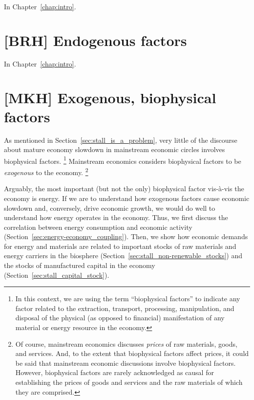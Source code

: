 In Chapter~\ref{chap:intro}.


\section{[BRH] Endogenous factors}
\label{sec:endogenous_factors}

In Chapter~\ref{chap:intro}.


\section{[MKH] Exogenous, biophysical factors}
\label{sec:exogenous_factors}

As mentioned in Section~\ref{sec:stall_is_a_problem}, 
very little of the discourse 
about mature economy slowdown 
in mainstream economic circles
involves biophysical factors.%
	\footnote{
	In this context, we are using the term ``biophysical factors''
	to indicate any factor related to 
	the extraction, transport, processing, manipulation, and disposal 
	of the physical (as opposed to financial) manifestation 
	of any material or energy resource in the economy.
	}
Mainstream economics considers biophysical factors
to be \emph{exogenous} to the economy.%
	\footnote{
	Of course, mainstream economics discusses \emph{prices}
	of raw materials, goods, and services. 
	And, to the extent that biophysical factors affect prices,
	it could be said that mainstream economic discussions involve
	biophysical factors.
	However, biophysical factors are rarely acknowledged as causal 
	for establishing the prices of goods and services and the raw materials 
	of which they are comprised.
	}

Arguably, the most important (but not the only) biophysical factor 
vis-\`{a}-vis the economy is energy.
If we are to understand how exogenous factors cause economic slowdown
and, conversely, drive economic growth,
we would do well to understand how energy operates in the economy.
Thus, we first discuss the correlation 
between energy consumption and economic activity 
(Section~\ref{sec:energy-economy_coupling}).
Then, we show how economic demands for energy and materials
are related to important stocks 
of raw materials and energy carriers in the biosphere 
(Section~\ref{sec:stall_non-renewable_stocks})
and the stocks of manufactured capital in the economy
(Section~\ref{sec:stall_capital_stock}).


